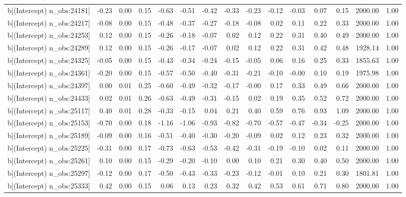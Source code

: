 \begin{table}[ht]
\begin{tabular}{rrrrrrrrrrrrrrr}
  b[(Intercept) n\_obs:24181] & -0.23 & 0.00 & 0.15 & -0.63 & -0.51 & -0.42 & -0.33 & -0.23 & -0.12 & -0.03 & 0.07 & 0.15 & 2000.00 & 1.00 \\ 
  b[(Intercept) n\_obs:24217] & -0.08 & 0.00 & 0.15 & -0.48 & -0.37 & -0.27 & -0.18 & -0.08 & 0.02 & 0.11 & 0.22 & 0.33 & 2000.00 & 1.00 \\ 
  b[(Intercept) n\_obs:24253] & 0.12 & 0.00 & 0.15 & -0.26 & -0.18 & -0.07 & 0.02 & 0.12 & 0.22 & 0.31 & 0.40 & 0.49 & 2000.00 & 1.00 \\ 
  b[(Intercept) n\_obs:24289] & 0.12 & 0.00 & 0.15 & -0.26 & -0.17 & -0.07 & 0.02 & 0.12 & 0.22 & 0.31 & 0.42 & 0.48 & 1928.14 & 1.00 \\ 
  b[(Intercept) n\_obs:24325] & -0.05 & 0.00 & 0.15 & -0.43 & -0.34 & -0.24 & -0.15 & -0.05 & 0.06 & 0.16 & 0.25 & 0.33 & 1855.63 & 1.00 \\ 
  b[(Intercept) n\_obs:24361] & -0.20 & 0.00 & 0.15 & -0.57 & -0.50 & -0.40 & -0.31 & -0.21 & -0.10 & -0.00 & 0.10 & 0.19 & 1975.98 & 1.00 \\ 
  b[(Intercept) n\_obs:24397] & 0.00 & 0.01 & 0.25 & -0.60 & -0.49 & -0.32 & -0.17 & -0.00 & 0.17 & 0.33 & 0.49 & 0.66 & 2000.00 & 1.00 \\ 
  b[(Intercept) n\_obs:24433] & 0.02 & 0.01 & 0.26 & -0.63 & -0.49 & -0.31 & -0.15 & 0.02 & 0.19 & 0.35 & 0.52 & 0.72 & 2000.00 & 1.00 \\ 
  b[(Intercept) n\_obs:25117] & 0.40 & 0.01 & 0.28 & -0.33 & -0.15 & 0.04 & 0.21 & 0.40 & 0.59 & 0.76 & 0.93 & 1.09 & 2000.00 & 1.00 \\ 
  b[(Intercept) n\_obs:25153] & -0.70 & 0.00 & 0.18 & -1.16 & -1.06 & -0.93 & -0.82 & -0.70 & -0.57 & -0.47 & -0.34 & -0.25 & 2000.00 & 1.00 \\ 
  b[(Intercept) n\_obs:25189] & -0.09 & 0.00 & 0.16 & -0.51 & -0.40 & -0.30 & -0.20 & -0.09 & 0.02 & 0.12 & 0.23 & 0.32 & 2000.00 & 1.00 \\ 
  b[(Intercept) n\_obs:25225] & -0.31 & 0.00 & 0.17 & -0.73 & -0.63 & -0.53 & -0.42 & -0.31 & -0.19 & -0.10 & 0.02 & 0.11 & 2000.00 & 1.00 \\ 
  b[(Intercept) n\_obs:25261] & 0.10 & 0.00 & 0.15 & -0.29 & -0.20 & -0.10 & 0.00 & 0.10 & 0.21 & 0.30 & 0.40 & 0.50 & 2000.00 & 1.00 \\ 
  b[(Intercept) n\_obs:25297] & -0.12 & 0.00 & 0.17 & -0.50 & -0.43 & -0.33 & -0.23 & -0.12 & -0.01 & 0.10 & 0.21 & 0.30 & 1801.81 & 1.00 \\ 
  b[(Intercept) n\_obs:25333] & 0.42 & 0.00 & 0.15 & 0.06 & 0.13 & 0.23 & 0.32 & 0.42 & 0.53 & 0.61 & 0.71 & 0.80 & 2000.00 & 1.00 \\ 

\end{tabular}
\end{table}
